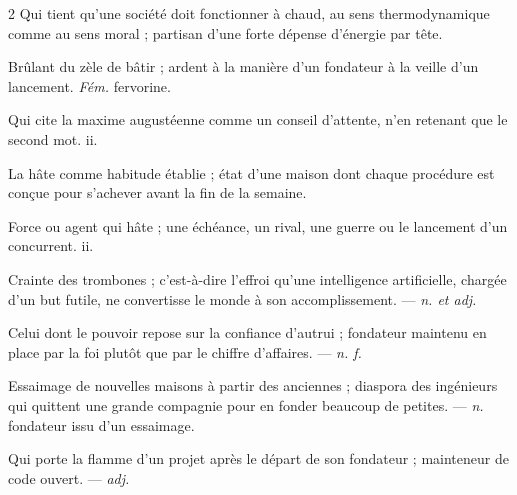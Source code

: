 \begin{multicols}{2}
 Qui tient qu'une société doit fonctionner à chaud, au sens thermodynamique comme au sens moral ; partisan d'une forte dépense d'énergie par tête.

 Brûlant du zèle de bâtir ; ardent à la manière d'un fondateur à la veille d'un lancement. \textit{Fém.} fervorine.

 Qui cite la maxime augustéenne comme un conseil d'attente, n'en retenant que le second mot.   ii.

 La hâte comme habitude établie ; état d'une maison dont chaque procédure est conçue pour s'achever avant la fin de la semaine.

 Force ou agent qui hâte ; une échéance, un rival, une guerre ou le lancement d'un concurrent.   ii.

 Crainte des trombones ; c'est-à-dire l'effroi qu'une intelligence artificielle, chargée d'un but futile, ne convertisse le monde à son accomplissement.   —  \textit{n. et adj.}

 Celui dont le pouvoir repose sur la confiance d'autrui ; fondateur maintenu en place par la foi plutôt que par le chiffre d'affaires.  —  \textit{n. f.}

 Essaimage de nouvelles maisons à partir des anciennes ; diaspora des ingénieurs qui quittent une grande compagnie pour en fonder beaucoup de petites.   —  \textit{n.} fondateur issu d'un essaimage.

 Qui porte la flamme d'un projet après le départ de son fondateur ; mainteneur de code ouvert.  —  \textit{adj.}


\end{multicols}
